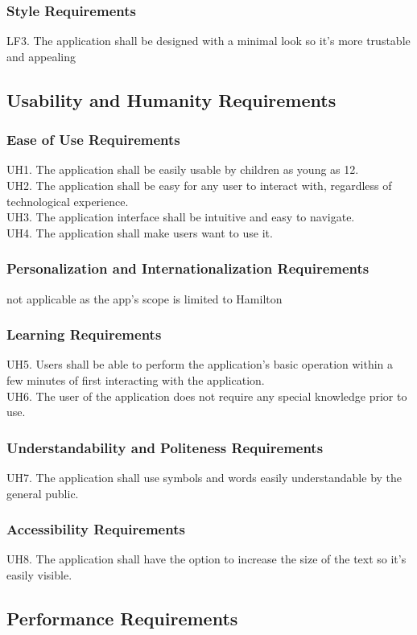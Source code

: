 \documentclass[12pt]{article}
\begin{document}
\subsubsection{Style Requirements}
LF3. The application shall be designed with a minimal look so it's more trustable and appealing
\subsection{Usability and Humanity Requirements}
\subsubsection{Ease of Use Requirements}
UH1.  The application shall be easily usable by children as young as 12.\\
UH2. The application shall be easy for any user to interact with, regardless of technological experience.\\
UH3. The application interface shall be intuitive and easy to navigate.\\
UH4. The application shall make users want to use it.
\subsubsection{Personalization and Internationalization Requirements}
not applicable as the app's scope is limited to Hamilton
\subsubsection{Learning Requirements}
UH5. Users shall be able to perform the application’s basic operation within a few minutes of first interacting with the application.\\
UH6. The user of the application does not require any special knowledge prior to use.
\subsubsection{Understandability and Politeness Requirements}
UH7. The application shall use symbols and words easily understandable by the general public.
\subsubsection{Accessibility Requirements}
UH8. The application shall have the option to increase the size of the text so it's easily visible.
\subsection{Performance Requirements}
\end{document}
